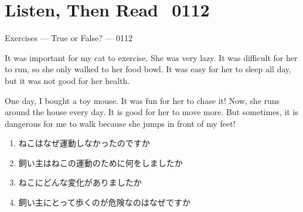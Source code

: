\documentclass[aspectratio=169,xcolor={dvipsnames,table}]{beamer}
\begin{document}
\section{Listen, Then Read\,\,\,\,\,{\tiny 0112}\,{\scriptsize {}}}
\begin{frame}[plain]{Exercises --- True or False? ---}
\scriptsize
\mbox{}\hfill{\tiny 0112}\,{\scriptsize {}}

\vspace{-3pt}
\small
\begin{tcolorbox}[colframe=ForestGreen,
  colback=NavyBlue!10!white,
  colbacktitle=NavyBlue!40!white,
  coltitle=black, %
before upper={\setlength{\parindent}{1.5em}},
  title=A Cat's Workout（ねこのトレーニング）]
It was important for my cat to exercise\footnotemark{}. She was very lazy. It was difficult for her to run, so she only walked to her food bowl. It was easy for her to sleep all day, but it was not good for her health.

One day, I bought a toy mouse. It was fun for her to chase\footnotemark{} it! Now, she runs around the house every day. It is good for her to move more. But sometimes, it is dangerous for me to walk because she jumps in front of \footnotemark{} my feet!
\end{tcolorbox}

\vspace{-3pt}

\begin{enumerate}\scriptsize\setlength{\itemsep}{-2pt}
 \item<2-> ねこはなぜ運動しなかったのですか\hfill{}
 \item<2-> 飼い主はねこの運動のために何をしましたか\hfill{}
 \item<2-> ねこにどんな変化がありましたか\hfill{}
 \item<2-> 飼い主にとって歩くのが危険なのはなぜですか\hfill{}
\end{enumerate}

\vspace{-15pt}



\end{frame}
\end{document}
